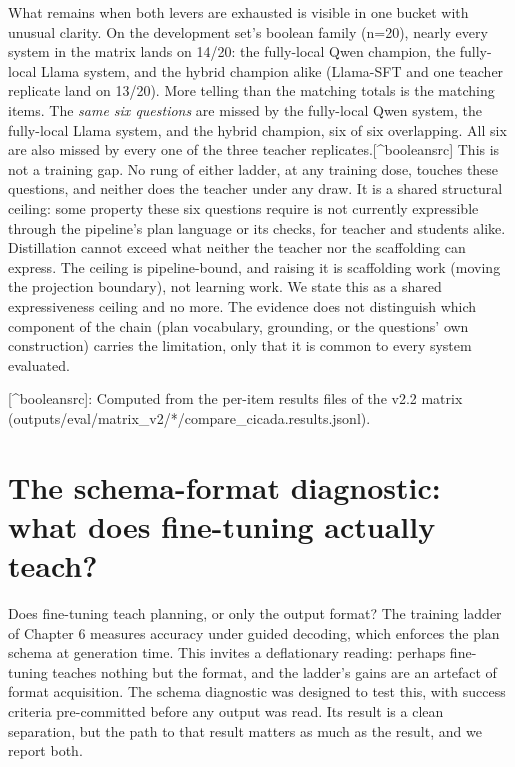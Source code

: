 What remains when both levers are exhausted is visible in one bucket with unusual clarity. On the development set's boolean family (n=20), nearly every system in the matrix lands on 14/20: the fully-local Qwen champion, the fully-local Llama system, and the hybrid champion alike (Llama-SFT and one teacher replicate land on 13/20). More telling than the matching totals is the matching items. The \emph{same six questions} are missed by the fully-local Qwen system, the fully-local Llama system, and the hybrid champion, six of six overlapping. All six are also missed by every one of the three teacher replicates.[\^{}booleansrc] This is not a training gap. No rung of either ladder, at any training dose, touches these questions, and neither does the teacher under any draw. It is a shared structural ceiling: some property these six questions require is not currently expressible through the pipeline's plan language or its checks, for teacher and students alike. Distillation cannot exceed what neither the teacher nor the scaffolding can express. The ceiling is pipeline-bound, and raising it is scaffolding work (moving the projection boundary), not learning work. We state this as a shared expressiveness ceiling and no more. The evidence does not distinguish which component of the chain (plan vocabulary, grounding, or the questions' own construction) carries the limitation, only that it is common to every system evaluated.

[\^{}booleansrc]: Computed from the per-item results files of the v2.2 matrix (outputs/eval/matrix\_v2/*/compare\_cicada.results.jsonl).

\section{The schema-format diagnostic: what does fine-tuning actually teach?}\label{sec:the-schema-format-diagnostic-what-does-f}

Does fine-tuning teach planning, or only the output format? The training ladder of Chapter 6 measures accuracy under guided decoding, which enforces the plan schema at generation time. This invites a deflationary reading: perhaps fine-tuning teaches nothing but the format, and the ladder's gains are an artefact of format acquisition. The schema diagnostic was designed to test this, with success criteria pre-committed before any output was read. Its result is a clean separation, but the path to that result matters as much as the result, and we report both.

